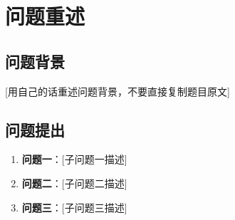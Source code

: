 
\section{问题重述}

\subsection{问题背景}

[用自己的话重述问题背景，不要直接复制题目原文]

\subsection{问题提出}

\begin{enumerate}
    \item \textbf{问题一}：[子问题一描述]
    \item \textbf{问题二}：[子问题二描述]
    \item \textbf{问题三}：[子问题三描述]
\end{enumerate}

